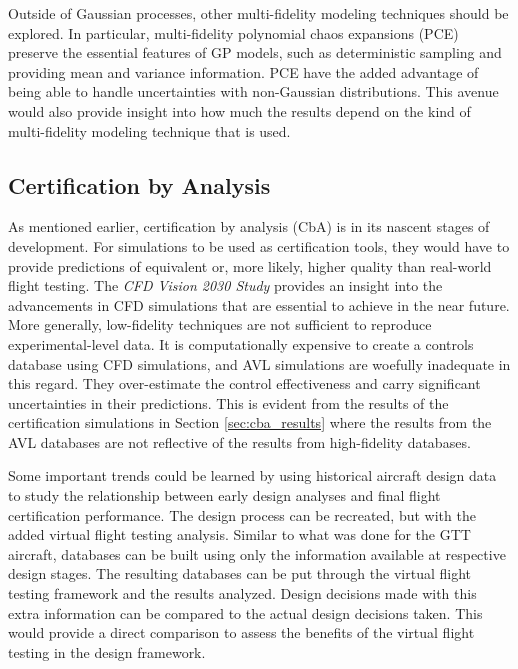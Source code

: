 Outside of Gaussian processes, other multi-fidelity modeling techniques should be explored. 
In particular, multi-fidelity polynomial chaos expansions (PCE) \cite{ng_multifidelity_2014} preserve the essential features of GP models, such as deterministic sampling and providing mean and variance information.
PCE have the added advantage of being able to handle uncertainties with non-Gaussian distributions. 
This avenue would also provide insight into how much the results depend on the kind of multi-fidelity modeling technique that is used. 

\subsection{Certification by Analysis}

As mentioned earlier, certification by analysis (CbA) is in its nascent stages of development.
For simulations to be used as certification tools, they would have to provide predictions of equivalent or, more likely, higher quality than real-world flight testing. 
The \textit{CFD Vision 2030 Study} \cite{slotnick_cfd_nodate} provides an insight into the advancements in CFD simulations that are essential to achieve in the near future. 
More generally, low-fidelity techniques are not sufficient to reproduce experimental-level data. 
It is computationally expensive to create a controls database using CFD simulations, and AVL simulations are woefully inadequate in this regard.
They over-estimate the control effectiveness and carry significant uncertainties in their predictions.
This is evident from the results of the certification simulations in Section \ref{sec:cba_results} where the results from the AVL databases are not reflective of the results from high-fidelity databases. 

Some important trends could be learned by using historical aircraft design data to study the relationship between early design analyses and final flight certification performance.
The design process can be recreated, but with the added virtual flight testing analysis.
Similar to what was done for the GTT aircraft, databases can be built using only the information available at respective design stages. 
The resulting databases can be put through the virtual flight testing framework and the results analyzed. 
Design decisions made with this extra information can be compared to the actual design decisions taken.
This would provide a direct comparison to assess the benefits of the virtual flight testing in the design framework. 

